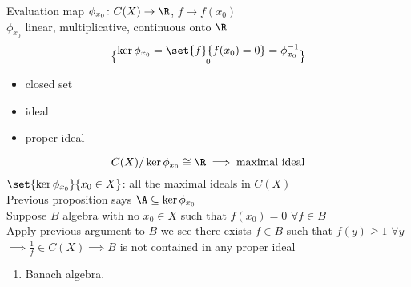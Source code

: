 \remark\marginpar{[optional]}Evaluation map $\phi_{x_0}\colon C(X)\to\R$, $f\mapsto f(x_0)$ \\
$\phi_{x_0}$ linear, multiplicative, continuous onto $\R$
\[ \ker\phi_{x_0} = \set{f}{f(x_0)=0} = \phi^{-1}_{x_0}\brace{0} \]
\begin{itemize}
\item closed set
\item ideal
\item proper ideal
\end{itemize}
\[ C(X)/\ker\phi_{x_0} \cong \R \implies \text{maximal ideal} \]
\thm $\set{\ker\phi_{x_0}}{x_0\in X}$: all the maximal ideals in $C(X)$ \\
Previous proposition says $\A\subseteq\ker\phi_{x_0}$ \\
Suppose $B$ algebra with no $x_0\in X$ such that $f(x_0)=0$ $\forall f\in B$ \\
Apply previous argument to $B$ we see there exists $f\in B$ such that $f(y)\geq1$ $\forall y$ \\
$\implies\frac{1}{f}\in C(X)\implies B$ is not contained in any proper ideal
\begin{enumerate}[label=$\bullet$]\item Banach algebra.\end{enumerate}